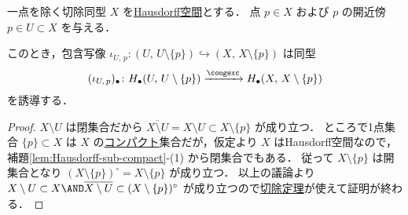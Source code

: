 \documentclass[algtopo_main]{subfiles}
\begin{document}
\begin{mylem}[label=lem:exc-Hausdorff]{一点を除く切除同型}
    $X$ を\underline{Hausdorff空間}とする．
    点 $p \in X$ および $p$ の開近傍 $p \in U \subset X$ を与える．

    このとき，包含写像 $\iota_{U,\, p} \colon (U,\, U \setminus \{p\}) \hookrightarrow (X,\, X\setminus\{p\})$ は同型
    \begin{align}
        (\iota_{U,\, p})_\bullet \colon H_\bullet (U,\, U\setminus\{p\}) \xrightarrow{\congexc} H_\bullet (X,\, X \setminus \{p\})
    \end{align}
    を誘導する．
\end{mylem}

\begin{proof}
    $X\setminus U$ は閉集合だから $\overline{X\setminus U} = X \setminus U \subset X \setminus \{p\}$ が成り立つ．
    ところで1点集合 $\{p\} \subset X$ は $X$ の\hyperref[def:compact]{コンパクト}集合だが，仮定より $X$ はHausdorff空間なので，補題\ref{lem:Hausdorff-sub-compact}-(1) から閉集合でもある．
    従って $X \setminus \{p\}$ は開集合となり $(X \setminus \{p\})^\circ = X \setminus \{p\}$ が成り立つ．
    以上の議論より $X \setminus U \subset X \AND \overline{X \setminus U} \subset (X \setminus \{p\})^\circ$ が成り立つので\hyperref[thm:exc]{切除定理}が使えて証明が終わる．
\end{proof}
\end{document}
